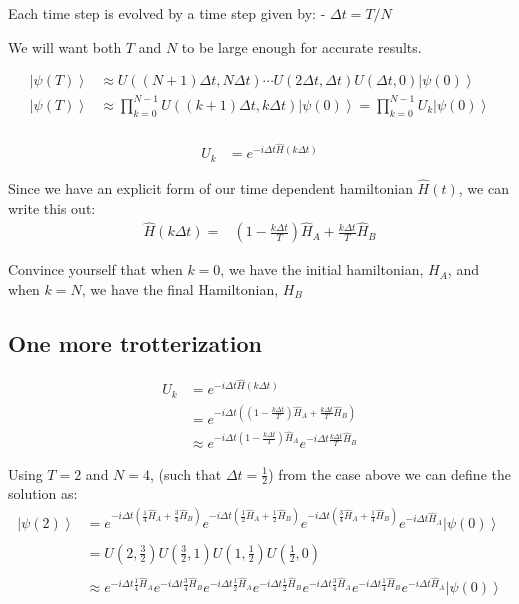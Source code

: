 \documentclass[11pt]{article}
\providecommand{\ket}[1]{\left|#1\right\rangle}
\begin{document}
Each time step is evolved by a time step given by: - \(\Delta t = T/N\)

We will want both \(T\) and \(N\) to be large enough for accurate
results.

\[
\begin{align}
\ket{\psi(T)} &\approx U((N+1)\Delta t, N\Delta t)\cdots U(2\Delta t, \Delta t)U(\Delta t, 0)\ket{\psi(0)} \\
\ket{\psi(T)} &\approx \prod_{k=0}^{N-1} U((k+1)\Delta t, k\Delta t)\ket{\psi(0)} = \prod_{k=0}^{N-1}U_k\ket{\psi(0)}\\
\end{align}
\]

\[
\begin{align}
U_k &= e^{-i\Delta t \hat{H}(k\Delta t)}
\end{align}
\]

Since we have an explicit form of our time dependent hamiltonian
\(\hat{H}(t)\), we can write this out: \[
\begin{align}
\hat{H}(k\Delta t) =& (1-\frac{k\Delta t}{T})\hat{H}_A + \frac{k\Delta t}{T}\hat{H}_B
\end{align}
\]

Convince yourself that when \(k=0\), we have the initial hamiltonian,
\(H_A\), and when \(k=N\), we have the final Hamiltonian, \(H_B\)

\subsection{One more trotterization}\label{one-more-trotterization}

\[
\begin{align}
U_k &= e^{-i\Delta t \hat{H}(k\Delta t)} \\
&= e^{-i\Delta t \left( (1-\frac{k\Delta t}{T})\hat{H}_A + \frac{k\Delta t}{T}\hat{H}_B\right)} \\
&\approx e^{-i\Delta t (1-\frac{k\Delta t}{T})\hat{H}_A}  e^{-i\Delta t \frac{k\Delta t}{T}\hat{H}_B} 
\end{align}
\]

    Using \(T=2\) and \(N=4\), (such that \(\Delta t = \tfrac{1}{2}\)) from
the case above we can define the solution as: \[
\begin{align}
\ket{\psi(2)} &= 
e^{-i\Delta t\left(\tfrac{1}{4}\hat{H}_A+\tfrac{3}{4}\hat{H}_B\right)}
e^{-i\Delta t\left(\tfrac{1}{2}\hat{H}_A+\tfrac{1}{2}\hat{H}_B\right)}
e^{-i\Delta t\left(\tfrac{3}{4}\hat{H}_A+\tfrac{1}{4}\hat{H}_B\right)}
e^{-i\Delta t\hat{H}_A} 
\ket{\psi(0)}\\\nonumber \\
&= 
U(2,\tfrac{3}{2})
U(\tfrac{3}{2},1)
U(1,\tfrac{1}{2})
U(\tfrac{1}{2},0) \\\nonumber \\
&\approx 
e^{-i\Delta t\tfrac{1}{4}\hat{H}_A}
e^{-i\Delta t\tfrac{3}{4}\hat{H}_B}
e^{-i\Delta t\tfrac{1}{2}\hat{H}_A}
e^{-i\Delta t\tfrac{1}{2}\hat{H}_B}
e^{-i\Delta t\tfrac{3}{4}\hat{H}_A}
e^{-i\Delta t\tfrac{1}{4}\hat{H}_B}
e^{-i\Delta t\hat{H}_A}
\ket{\psi(0)}\\
\end{align}
\]
\end{document}
